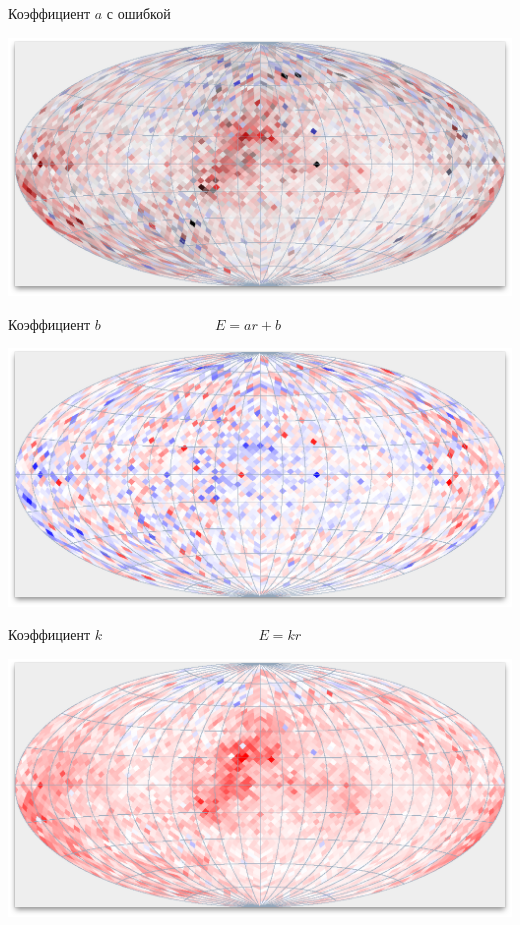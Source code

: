 \documentclass[14pt, fleqn, xcolor={dvipsnames, table}]{beamer}
\begin{document}
        \begin{frame}{Коэффициент $a$ с ошибкой}
            \begin{center}
                \includegraphics[scale=0.32]{map-a-sigma.png}
            \end{center}             
        \end{frame}
        
        \begin{frame}{Коэффициент $b$ ~~~~~~~~~~~~~~~ $E = a r + b$}
            \begin{center}
                \includegraphics[scale=0.32]{map-b-white.png}
            \end{center}             
        \end{frame}
        
        \begin{frame}{Коэффициент $k$ ~~~~~~~~~~~~~~~~~~~~~ $E = k r$}
            \begin{center}
                \includegraphics[scale=0.32]{map-k.png}
            \end{center}             
        \end{frame}
        
\end{document}
